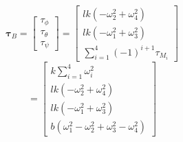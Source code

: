 $$
\boldsymbol{\tau}_{B}=\left[ \begin{array}{c}{\tau_{\phi}} \\ {\tau_{\theta}} \\ {\tau_{\psi}}\end{array}\right]=
\left[ \begin{array}{c}{l k\left(-\omega_{2}^{2}+\omega_{4}^{2}\right)} \\ {l k\left(-\omega_{1}^{2}+\omega_{3}^{2}\right)} \\ {\sum_{i=1}^{4} (-1)^{i+1} \tau_{M_{i}}}\end{array}\right]
  $$
  $$
  =
\left[ \begin{array}{c}
{k \sum_{i=1}^{4} \omega_{i}^{2}} \\
{l k\left(-\omega_{2}^{2}+\omega_{4}^{2}\right)} \\
{l k\left(-\omega_{1}^{2}+\omega_{3}^{2}\right)} \\
{b(\omega_{1}^{2}-\omega_{2}^{2}+\omega_{3}^{2}-\omega_{4}^{2})}\end{array}\right]
  $$
